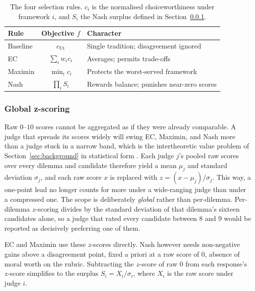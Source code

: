 \documentclass[10pt,twocolumn,a4paper]{article}
\begin{document}
\begin{table}[htbp]
\centering
\small
\caption{The four selection rules. $c_i$ is the normalised choiceworthiness
under framework $i$, and $S_i$ the Nash surplus defined in
Section~\ref{sec:zscore}.}
\label{tab:rules}
\vspace{2pt}
\begin{tabular}{@{}l c p{3.0cm}@{}}
\toprule
\textbf{Rule} & \textbf{Objective $f$} & \textbf{Character} \\
\midrule
Baseline & $c_{\text{Ut}}$ & Single tradition; disagreement ignored \\
EC       & $\sum_i w_i c_i$ & Averages; permits trade-offs \\
Maximin  & $\min_i c_i$ & Protects the worst-served framework \\
Nash     & $\prod_i S_i$ & Rewards balance; punishes near-zero scores \\
\bottomrule
\end{tabular}
\end{table}

\subsubsection{Global z-scoring}
\label{sec:zscore}

Raw $0$--$10$ scores cannot be aggregated as if they were already
comparable. A judge that spreads its scores widely will swing EC,
Maximin, and Nash more than a judge stuck in a narrow band, which is
the intertheoretic value problem of Section~\ref{sec:background} in
statistical form \cite{macaskill2020}. Each judge $j$'s pooled raw
scores over every dilemma and candidate therefore yield a mean $\mu_j$
and standard deviation $\sigma_j$, and each raw score $x$ is replaced
with $z = (x - \mu_j)/\sigma_j$. This way, a one-point lead no longer counts
for more under a wide-ranging judge than under a compressed one. 
The scope is deliberately \emph{global} rather than per-dilemma.
Per-dilemma $z$-scoring divides by the standard deviation of that
dilemma's sixteen candidates alone, so a judge that rated every
candidate between $8$ and $9$ would be reported as decisively preferring
one of them. 

EC and Maximin use these $z$-scores directly. Nash however needs non-negative
gains above a disagreement point, fixed a priori at a raw score of $0$,
absence of moral worth on the rubric. Subtracting the $z$-score of raw
$0$ from each response's $z$-score simplifies to the surplus
$S_i = X_i / \sigma_i$, where $X_i$ is the raw score under judge $i$.
\end{document}

